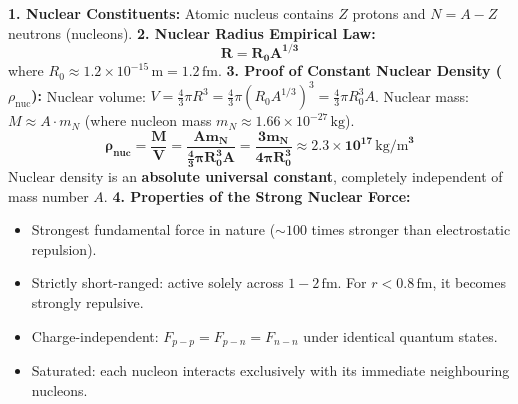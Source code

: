\documentclass[10pt,a4paper]{article}
\begin{document}
\begin{conceptbox}
\textbf{1. Nuclear Constituents:}
Atomic nucleus contains $Z$ protons and $N = A - Z$ neutrons (nucleons).
\textbf{2. Nuclear Radius Empirical Law:}
\begin{equation}
  \mathbf{R = R_0 A^{1/3}}
\end{equation}
where $R_0 \approx 1.2 \times 10^{-15}\,\mathrm{m} = 1.2\,\mathrm{fm}$.
\textbf{3. Proof of Constant Nuclear Density ($\rho_{\text{nuc}}$):}
Nuclear volume: $V = \frac{4}{3}\pi R^3 = \frac{4}{3}\pi (R_0 A^{1/3})^3 = \frac{4}{3}\pi R_0^3 A$.
Nuclear mass: $M \approx A \cdot m_N$ (where nucleon mass $m_N \approx 1.66 \times 10^{-27}\,\mathrm{kg}$).
\begin{equation}
  \mathbf{\rho_{\text{nuc}} = \frac{M}{V} = \frac{A m_N}{\frac{4}{3}\pi R_0^3 A} = \frac{3 m_N}{4\pi R_0^3} \approx 2.3 \times 10^{17}\,\mathrm{kg/m}^3}
\end{equation}
Nuclear density is an \textbf{absolute universal constant}, completely independent of mass number $A$.
\textbf{4. Properties of the Strong Nuclear Force:}
\begin{itemize}
  \item Strongest fundamental force in nature ($\sim 100$ times stronger than electrostatic repulsion).
  \item Strictly short-ranged: active solely across $1 - 2\,\mathrm{fm}$. For $r < 0.8\,\mathrm{fm}$, it becomes strongly repulsive.
  \item Charge-independent: $F_{p-p} = F_{p-n} = F_{n-n}$ under identical quantum states.
  \item Saturated: each nucleon interacts exclusively with its immediate neighbouring nucleons.
\end{itemize}
\end{conceptbox}
\end{document}
